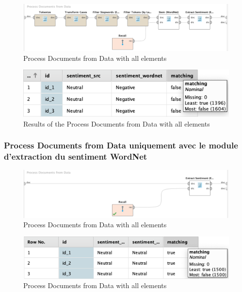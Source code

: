 \documentclass[a4paper]{article}
\begin{document}
\begin{figure}[H]
	\includegraphics[width=\linewidth]{imgs/part_3/3_processing_documents_full}
	\caption{Process Documents from Data with all elements}
	\label{fig:3_processing_documents_full}
\end{figure}
\begin{figure}[H]
	\includegraphics[width=\linewidth]{imgs/part_3/3_processing_documents_full_results}
	\caption{Results of the Process Documents from Data with all elements}
	\label{fig:3_processing_documents_full_results}
\end{figure}


\subsubsection{Process Documents from Data uniquement avec le module d'extraction du sentiment WordNet}
\begin{figure}[H]
	\includegraphics[width=\linewidth]{imgs/part_3/3_processing_documents_no_stem_filter_token_stopword_transform_tokens}
	\caption{Process Documents from Data with all elements}
	\label{fig:3_processing_documents_full}
\end{figure}
\begin{figure}[H]
	\includegraphics[width=\linewidth]{imgs/part_3/3_processing_documents_no_stem_filter_token_stopword_transform_tokens_results}
	\caption{Process Documents from Data with all elements}
	\label{fig:3_processing_documents_full}
\end{figure}
\end{document}
